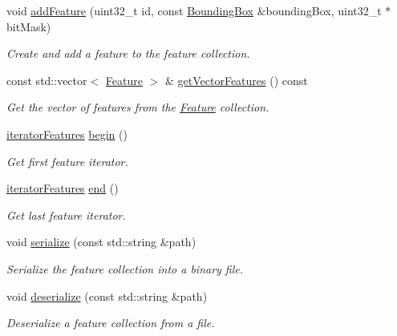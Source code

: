 \begin{DoxyCompactItemize}
void \hyperlink{classfc_1_1FeatureCollection_a4c55b86ac61d97aa9ca21ff64e16061b}{add\+Feature} (uint32\+\_\+t id, const \hyperlink{classfc_1_1BoundingBox}{Bounding\+Box} \&bounding\+Box, uint32\+\_\+t $\ast$bit\+Mask)
\begin{DoxyCompactList}\small\item\em Create and add a feature to the feature collection. \end{DoxyCompactList}\item 
const std\+::vector$<$ \hyperlink{classfc_1_1Feature}{Feature} $>$ \& \hyperlink{classfc_1_1FeatureCollection_aafe9d7aca03c11d4d26a28f7e9360612}{get\+Vector\+Features} () const
\begin{DoxyCompactList}\small\item\em Get the vector of features from the \hyperlink{classfc_1_1Feature}{Feature} collection. \end{DoxyCompactList}\item 
\hyperlink{classfc_1_1FeatureCollection_a947efbbe893a14c47d2d5e535a0e9429}{iterator\+Features} \hyperlink{classfc_1_1FeatureCollection_acec3cae7f29d3970921b78a95c199ef3}{begin} ()
\begin{DoxyCompactList}\small\item\em Get first feature iterator. \end{DoxyCompactList}\item 
\hyperlink{classfc_1_1FeatureCollection_a947efbbe893a14c47d2d5e535a0e9429}{iterator\+Features} \hyperlink{classfc_1_1FeatureCollection_ac531c63b2dae4e4541b26a3926594dd0}{end} ()
\begin{DoxyCompactList}\small\item\em Get last feature iterator. \end{DoxyCompactList}\item 
void \hyperlink{classfc_1_1FeatureCollection_a4a95b20ba9f339a326878591a244b50d}{serialize} (const std\+::string \&path)
\begin{DoxyCompactList}\small\item\em Serialize the feature collection into a binary file. \end{DoxyCompactList}\item 
void \hyperlink{classfc_1_1FeatureCollection_aad397b4427b4c8805e3330cda59330ef}{deserialize} (const std\+::string \&path)
\begin{DoxyCompactList}\small\item\em Deserialize a feature collection from a file. \end{DoxyCompactList}\item 

\end{DoxyCompactItemize}
